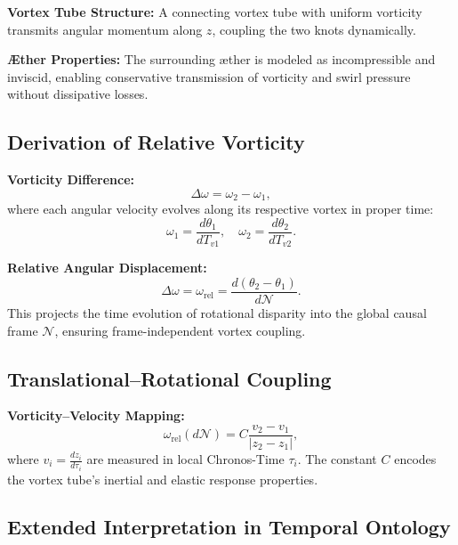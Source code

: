 \documentclass[12pt]{article}
\begin{document}
    \textbf{Vortex Tube Structure:} A connecting vortex tube with uniform vorticity transmits angular momentum along \( z \), coupling the two knots dynamically.

    \textbf{Æther Properties:} The surrounding æther is modeled as incompressible and inviscid, enabling conservative transmission of vorticity and swirl pressure without dissipative losses.

    \subsection*{Derivation of Relative Vorticity}

    \textbf{Vorticity Difference:}
    \begin{equation*}
        \Delta \omega = \omega_2 - \omega_1,
    \end{equation*}
    where each angular velocity evolves along its respective vortex in proper time:
    \begin{equation*}
        \omega_1 = \frac{d\theta_1}{dT_{v1}}, \quad \omega_2 = \frac{d\theta_2}{dT_{v2}}.
    \end{equation*}

    \textbf{Relative Angular Displacement:}
    \begin{equation*}
        \Delta \omega = \omega_\text{rel} = \frac{d(\theta_2 - \theta_1)}{d\mathcal{N}}.
    \end{equation*}
    This projects the time evolution of rotational disparity into the global causal frame \( \mathcal{N} \), ensuring frame-independent vortex coupling.

    \subsection*{Translational–Rotational Coupling}

    \textbf{Vorticity–Velocity Mapping:}
    \begin{equation*}
        \omega_\text{rel}(d\mathcal{N}) = C \frac{v_2 - v_1}{|z_2 - z_1|},
    \end{equation*}
    where \( v_i = \frac{dz_i}{d\tau_i} \) are measured in local Chronos-Time \( \tau_i \). The constant \( C \) encodes the vortex tube’s inertial and elastic response properties.

    \subsection*{Extended Interpretation in Temporal Ontology}
\end{document}
